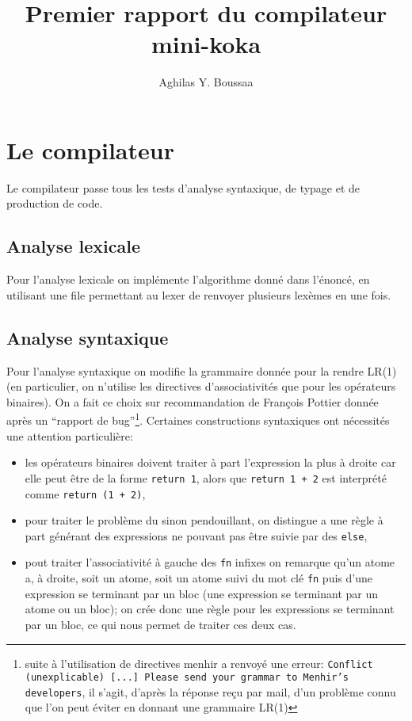 \documentclass[11pt]{article}
\author{Aghilas Y. Boussaa}
\title{Premier rapport du compilateur mini-koka}
\begin{document}
\maketitle
\section{Le compilateur}
Le compilateur passe tous les tests d'analyse syntaxique, de typage et de
production de code.

\subsection{Analyse lexicale}
Pour l'analyse lexicale on implémente l'algorithme donné
dans l'énoncé, en utilisant une file permettant au lexer de renvoyer plusieurs
lexèmes en une fois.

\subsection{Analyse syntaxique}
Pour l'analyse syntaxique on modifie la grammaire donnée pour la rendre LR(1)
(en particulier, on n'utilise les directives d'associativités que pour les
opérateurs binaires). On a fait ce choix sur recommandation de François Pottier
donnée après un ``rapport de bug''\footnote{suite à l'utilisation de directives
menhir a renvoyé une erreur: \texttt{Conflict (unexplicable) [...] Please send
  your grammar to Menhir's developers}, il s'agit, d'après la réponse reçu par
mail, d'un problème connu que l'on peut éviter en donnant une grammaire
LR(1)}. Certaines constructions syntaxiques ont nécessités une attention
particulière:
\begin{itemize}
  \item les opérateurs binaires doivent traiter à part l'expression la plus à
    droite car elle peut être de la forme \texttt{return 1}, alors que
    \texttt{return 1 + 2} est interprété comme \texttt{return (1 + 2)},
  \item pour traiter le problème du sinon pendouillant, on distingue a une règle
    à part générant des expressions ne pouvant pas être suivie par des
    \texttt{else},
  \item pout traiter l'associativité à gauche des \texttt{fn} infixes on
    remarque qu'un atome a, à droite, soit un atome, soit un atome suivi du mot
    clé \texttt{fn} puis d'une expression se terminant par un bloc (une
    expression se terminant par un atome ou un bloc); on crée donc une règle
    pour les expressions se terminant par un bloc, ce qui nous permet de traiter
    ces deux cas.
\end{itemize}
\end{document}
